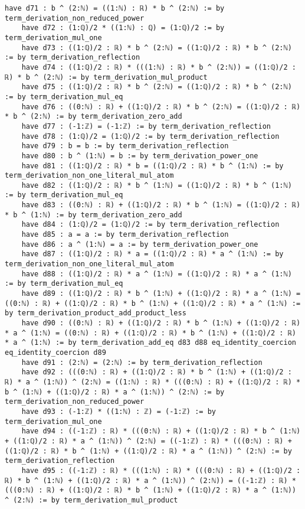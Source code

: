 \documentclass{article}
\begin{document}
\begin{tcolorbox}[colback=white!10, width=\linewidth]
\begin{lstlisting}[language=Lean4]
    have d71 : b ^ (2:ℕ) = ((1:ℕ) : ℝ) * b ^ (2:ℕ) := by term_derivation_non_reduced_power
    have d72 : (1:ℚ)/2 * ((1:ℕ) : ℚ) = (1:ℚ)/2 := by term_derivation_mul_one
    have d73 : ((1:ℚ)/2 : ℝ) * b ^ (2:ℕ) = ((1:ℚ)/2 : ℝ) * b ^ (2:ℕ) := by term_derivation_reflection
    have d74 : ((1:ℚ)/2 : ℝ) * (((1:ℕ) : ℝ) * b ^ (2:ℕ)) = ((1:ℚ)/2 : ℝ) * b ^ (2:ℕ) := by term_derivation_mul_product
    have d75 : ((1:ℚ)/2 : ℝ) * b ^ (2:ℕ) = ((1:ℚ)/2 : ℝ) * b ^ (2:ℕ) := by term_derivation_mul_eq
    have d76 : ((0:ℕ) : ℝ) + ((1:ℚ)/2 : ℝ) * b ^ (2:ℕ) = ((1:ℚ)/2 : ℝ) * b ^ (2:ℕ) := by term_derivation_zero_add
    have d77 : (-1:ℤ) = (-1:ℤ) := by term_derivation_reflection
    have d78 : (1:ℚ)/2 = (1:ℚ)/2 := by term_derivation_reflection
    have d79 : b = b := by term_derivation_reflection
    have d80 : b ^ (1:ℕ) = b := by term_derivation_power_one
    have d81 : ((1:ℚ)/2 : ℝ) * b = ((1:ℚ)/2 : ℝ) * b ^ (1:ℕ) := by term_derivation_non_one_literal_mul_atom
    have d82 : ((1:ℚ)/2 : ℝ) * b ^ (1:ℕ) = ((1:ℚ)/2 : ℝ) * b ^ (1:ℕ) := by term_derivation_mul_eq
    have d83 : ((0:ℕ) : ℝ) + ((1:ℚ)/2 : ℝ) * b ^ (1:ℕ) = ((1:ℚ)/2 : ℝ) * b ^ (1:ℕ) := by term_derivation_zero_add
    have d84 : (1:ℚ)/2 = (1:ℚ)/2 := by term_derivation_reflection
    have d85 : a = a := by term_derivation_reflection
    have d86 : a ^ (1:ℕ) = a := by term_derivation_power_one
    have d87 : ((1:ℚ)/2 : ℝ) * a = ((1:ℚ)/2 : ℝ) * a ^ (1:ℕ) := by term_derivation_non_one_literal_mul_atom
    have d88 : ((1:ℚ)/2 : ℝ) * a ^ (1:ℕ) = ((1:ℚ)/2 : ℝ) * a ^ (1:ℕ) := by term_derivation_mul_eq
    have d89 : ((1:ℚ)/2 : ℝ) * b ^ (1:ℕ) + ((1:ℚ)/2 : ℝ) * a ^ (1:ℕ) = ((0:ℕ) : ℝ) + ((1:ℚ)/2 : ℝ) * b ^ (1:ℕ) + ((1:ℚ)/2 : ℝ) * a ^ (1:ℕ) := by term_derivation_product_add_product_less
    have d90 : ((0:ℕ) : ℝ) + ((1:ℚ)/2 : ℝ) * b ^ (1:ℕ) + ((1:ℚ)/2 : ℝ) * a ^ (1:ℕ) = ((0:ℕ) : ℝ) + ((1:ℚ)/2 : ℝ) * b ^ (1:ℕ) + ((1:ℚ)/2 : ℝ) * a ^ (1:ℕ) := by term_derivation_add_eq d83 d88 eq_identity_coercion eq_identity_coercion d89
    have d91 : (2:ℕ) = (2:ℕ) := by term_derivation_reflection
    have d92 : (((0:ℕ) : ℝ) + ((1:ℚ)/2 : ℝ) * b ^ (1:ℕ) + ((1:ℚ)/2 : ℝ) * a ^ (1:ℕ)) ^ (2:ℕ) = ((1:ℕ) : ℝ) * (((0:ℕ) : ℝ) + ((1:ℚ)/2 : ℝ) * b ^ (1:ℕ) + ((1:ℚ)/2 : ℝ) * a ^ (1:ℕ)) ^ (2:ℕ) := by term_derivation_non_reduced_power
    have d93 : (-1:ℤ) * ((1:ℕ) : ℤ) = (-1:ℤ) := by term_derivation_mul_one
    have d94 : ((-1:ℤ) : ℝ) * (((0:ℕ) : ℝ) + ((1:ℚ)/2 : ℝ) * b ^ (1:ℕ) + ((1:ℚ)/2 : ℝ) * a ^ (1:ℕ)) ^ (2:ℕ) = ((-1:ℤ) : ℝ) * (((0:ℕ) : ℝ) + ((1:ℚ)/2 : ℝ) * b ^ (1:ℕ) + ((1:ℚ)/2 : ℝ) * a ^ (1:ℕ)) ^ (2:ℕ) := by term_derivation_reflection
    have d95 : ((-1:ℤ) : ℝ) * (((1:ℕ) : ℝ) * (((0:ℕ) : ℝ) + ((1:ℚ)/2 : ℝ) * b ^ (1:ℕ) + ((1:ℚ)/2 : ℝ) * a ^ (1:ℕ)) ^ (2:ℕ)) = ((-1:ℤ) : ℝ) * (((0:ℕ) : ℝ) + ((1:ℚ)/2 : ℝ) * b ^ (1:ℕ) + ((1:ℚ)/2 : ℝ) * a ^ (1:ℕ)) ^ (2:ℕ) := by term_derivation_mul_product

\end{lstlisting}
\end{tcolorbox}
\end{document}
